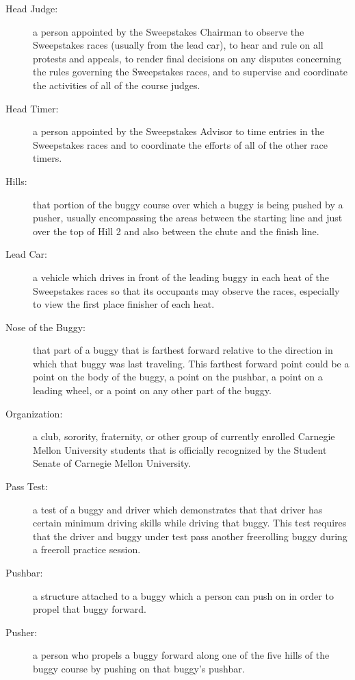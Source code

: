 \begin{description}
	\item[Head Judge:]
	a person appointed by the Sweepstakes Chairman to observe the Sweepstakes
	races (usually from the lead car), to hear and rule on all protests and
	appeals, to render final decisions on any disputes concerning the rules
	governing the Sweepstakes races, and to supervise and coordinate the activities
	of all of the course judges.

	\item[Head Timer:]
	a person appointed by the Sweepstakes Advisor to time entries in the
	Sweepstakes races and to coordinate the efforts of all of the other race
	timers.

	\item[Hills:]
	that portion of the buggy course over which a buggy is being pushed by a
	pusher, usually encompassing the areas between the starting line and just over
	the top of Hill 2 and also between the chute and the finish line.

	\item[Lead Car:]
	a vehicle which drives in front of the leading buggy in each heat of the
	Sweepstakes races so that its occupants may observe the races, especially to
	view the first place finisher of each heat.

	\item[Nose of the Buggy:]
	that part of a buggy that is farthest forward relative to the direction in
	which that buggy was last traveling. This farthest forward point could be a
	point on the body of the buggy, a point on the pushbar, a point on a leading
	wheel, or a point on any other part of the buggy.

	\item[Organization:]
	a club, sorority, fraternity, or other group of currently enrolled Carnegie
	Mellon University students that is officially recognized by the Student Senate
	of Carnegie Mellon University.

	\item[Pass Test:]
	a test of a buggy and driver which demonstrates that that driver has
	certain minimum driving skills while driving that buggy. This test requires
	that the driver and buggy under test pass another freerolling buggy during a
	freeroll practice session.

	\item[Pushbar:]
	a structure attached to a buggy which a person can push on in order to
	propel that buggy forward.

	\item[Pusher:]
	a person who propels a buggy forward along one of the five hills of the
	buggy course by pushing on that buggy's pushbar.


\end{description}
